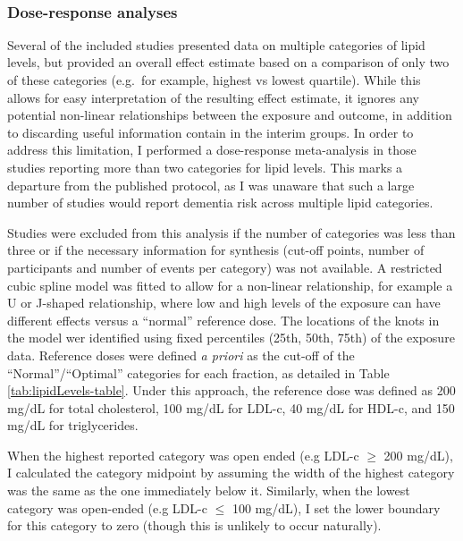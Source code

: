 \documentclass[a4paper, twoside]{templates/ociamthesis}
\begin{document}
~

\hypertarget{dose-response-analyses}{%
\subsubsection{Dose-response analyses}\label{dose-response-analyses}}

Several of the included studies presented data on multiple categories of lipid levels, but provided an overall effect estimate based on a comparison of only two of these categories (e.g.~for example, highest vs lowest quartile). While this allows for easy interpretation of the resulting effect estimate, it ignores any potential non-linear relationships between the exposure and outcome, in addition to discarding useful information contain in the interim groups. In order to address this limitation, I performed a dose-response meta-analysis in those studies reporting more than two categories for lipid levels. This marks a departure from the published protocol, as I was unaware that such a large number of studies would report dementia risk across multiple lipid categories.

Studies were excluded from this analysis if the number of categories was less than three or if the necessary information for synthesis (cut-off points, number of participants and number of events per category) was not available. A restricted cubic spline model was fitted to allow for a non-linear relationship, for example a U or J-shaped relationship, where low and high levels of the exposure can have different effects versus a ``normal'' reference dose. The locations of the knots in the model wer identified using fixed percentiles (25th, 50th, 75th) of the exposure data. Reference doses were defined \emph{a priori} as the cut-off of the ``Normal''/``Optimal'' categories for each fraction, as detailed in Table \ref{tab:lipidLevels-table}. Under this approach, the reference dose was defined as 200 mg/dL for total cholesterol, 100 mg/dL for LDL-c, 40 mg/dL for HDL-c, and 150 mg/dL for triglycerides.

When the highest reported category was open ended (e.g LDL-c \(\geqslant\) 200 mg/dL), I calculated the category midpoint by assuming the width of the highest category was the same as the one immediately below it. Similarly, when the lowest category was open-ended (e.g LDL-c \(\leqslant\) 100 mg/dL), I set the lower boundary for this category to zero (though this is unlikely to occur naturally).

~
\end{document}
